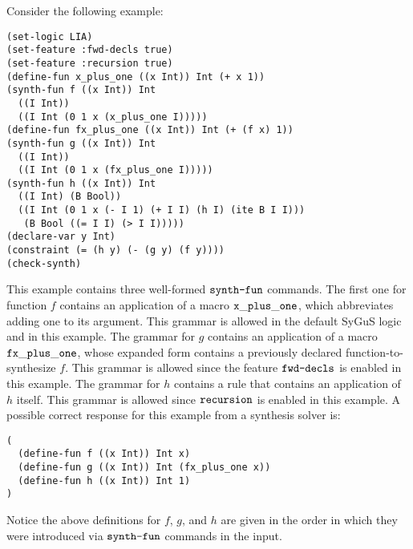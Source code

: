 \documentclass[english,a4paper,10pt]{article}
\begin{document}
\begin{example}
Consider the following example:
\begin{lstlisting}[language=SyGuS]
(set-logic LIA)
(set-feature :fwd-decls true)
(set-feature :recursion true)
(define-fun x_plus_one ((x Int)) Int (+ x 1))
(synth-fun f ((x Int)) Int
  ((I Int))
  ((I Int (0 1 x (x_plus_one I)))))
(define-fun fx_plus_one ((x Int)) Int (+ (f x) 1))
(synth-fun g ((x Int)) Int
  ((I Int))
  ((I Int (0 1 x (fx_plus_one I)))))
(synth-fun h ((x Int)) Int
  ((I Int) (B Bool))
  ((I Int (0 1 x (- I 1) (+ I I) (h I) (ite B I I)))
   (B Bool ((= I I) (> I I)))))
(declare-var y Int)
(constraint (= (h y) (- (g y) (f y))))
(check-synth)
\end{lstlisting}
This example contains three well-formed $\texttt{synth-fun}$ commands.
The first one for function $f$ contains an application of a macro ${\tt x\_plus\_one}$,
which abbreviates adding one to its argument.
This grammar is allowed in the default SyGuS logic
and in this example.
The grammar for $g$ contains an application of a macro ${\tt fx\_plus\_one}$,
whose expanded form contains a previously declared function-to-synthesize $f$.
This grammar is allowed since the feature $\texttt{fwd-decls}$ is enabled in this example.
The grammar for $h$ contains a rule that contains an application of $h$ itself.
This grammar is allowed since $\texttt{recursion}$ is enabled in this example.
A possible correct response for this example from a synthesis solver is:
\begin{lstlisting}[language=SyGuS]
(
  (define-fun f ((x Int)) Int x)
  (define-fun g ((x Int)) Int (fx_plus_one x))
  (define-fun h ((x Int)) Int 1)
)
\end{lstlisting}
Notice the above definitions for $f$, $g$, and $h$ are given 
in the order in which they were introduced via $\texttt{synth-fun}$ commands
in the input.
\end{example}
\end{document}
